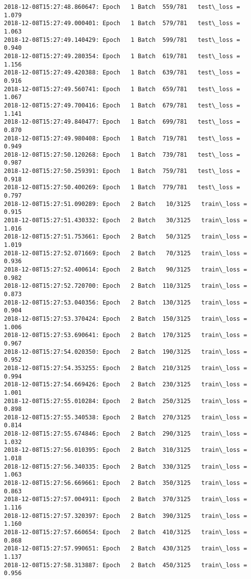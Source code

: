 \documentclass[11pt]{article}
\begin{document}
\begin{Verbatim}[commandchars=\\\{\}]
2018-12-08T15:27:48.860647: Epoch   1 Batch  559/781   test\_loss = 1.079
2018-12-08T15:27:49.000401: Epoch   1 Batch  579/781   test\_loss = 1.063
2018-12-08T15:27:49.140429: Epoch   1 Batch  599/781   test\_loss = 0.940
2018-12-08T15:27:49.280354: Epoch   1 Batch  619/781   test\_loss = 1.156
2018-12-08T15:27:49.420388: Epoch   1 Batch  639/781   test\_loss = 0.916
2018-12-08T15:27:49.560741: Epoch   1 Batch  659/781   test\_loss = 1.067
2018-12-08T15:27:49.700416: Epoch   1 Batch  679/781   test\_loss = 1.141
2018-12-08T15:27:49.840477: Epoch   1 Batch  699/781   test\_loss = 0.870
2018-12-08T15:27:49.980408: Epoch   1 Batch  719/781   test\_loss = 0.949
2018-12-08T15:27:50.120268: Epoch   1 Batch  739/781   test\_loss = 0.987
2018-12-08T15:27:50.259391: Epoch   1 Batch  759/781   test\_loss = 0.918
2018-12-08T15:27:50.400269: Epoch   1 Batch  779/781   test\_loss = 0.797
2018-12-08T15:27:51.090289: Epoch   2 Batch   10/3125   train\_loss = 0.915
2018-12-08T15:27:51.430332: Epoch   2 Batch   30/3125   train\_loss = 1.016
2018-12-08T15:27:51.753661: Epoch   2 Batch   50/3125   train\_loss = 1.019
2018-12-08T15:27:52.071669: Epoch   2 Batch   70/3125   train\_loss = 0.936
2018-12-08T15:27:52.400614: Epoch   2 Batch   90/3125   train\_loss = 0.982
2018-12-08T15:27:52.720700: Epoch   2 Batch  110/3125   train\_loss = 0.873
2018-12-08T15:27:53.040356: Epoch   2 Batch  130/3125   train\_loss = 0.904
2018-12-08T15:27:53.370424: Epoch   2 Batch  150/3125   train\_loss = 1.006
2018-12-08T15:27:53.690641: Epoch   2 Batch  170/3125   train\_loss = 0.967
2018-12-08T15:27:54.020350: Epoch   2 Batch  190/3125   train\_loss = 0.952
2018-12-08T15:27:54.353255: Epoch   2 Batch  210/3125   train\_loss = 0.994
2018-12-08T15:27:54.669426: Epoch   2 Batch  230/3125   train\_loss = 1.001
2018-12-08T15:27:55.010284: Epoch   2 Batch  250/3125   train\_loss = 0.898
2018-12-08T15:27:55.340538: Epoch   2 Batch  270/3125   train\_loss = 0.814
2018-12-08T15:27:55.674846: Epoch   2 Batch  290/3125   train\_loss = 1.032
2018-12-08T15:27:56.010395: Epoch   2 Batch  310/3125   train\_loss = 1.018
2018-12-08T15:27:56.340335: Epoch   2 Batch  330/3125   train\_loss = 1.063
2018-12-08T15:27:56.669661: Epoch   2 Batch  350/3125   train\_loss = 0.863
2018-12-08T15:27:57.004911: Epoch   2 Batch  370/3125   train\_loss = 1.116
2018-12-08T15:27:57.320397: Epoch   2 Batch  390/3125   train\_loss = 1.160
2018-12-08T15:27:57.660654: Epoch   2 Batch  410/3125   train\_loss = 0.868
2018-12-08T15:27:57.990651: Epoch   2 Batch  430/3125   train\_loss = 1.137
2018-12-08T15:27:58.313887: Epoch   2 Batch  450/3125   train\_loss = 0.956

\end{Verbatim}
\end{document}
